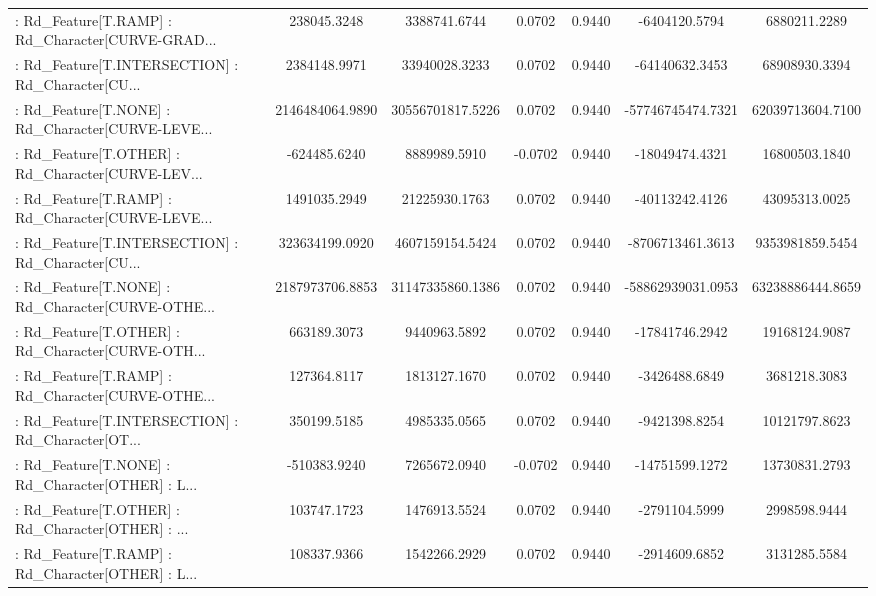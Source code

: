 \begin{longtable}{p{4cm}cccccc}
 : Rd\_Feature[T.RAMP] : Rd\_Character[CURVE-GRAD... &       238045.3248 &      3388741.6744 &  0.0702 &       0.9440 &      -6404120.5794 &      6880211.2289 \\
 : Rd\_Feature[T.INTERSECTION] : Rd\_Character[CU... &      2384148.9971 &     33940028.3233 &  0.0702 &       0.9440 &     -64140632.3453 &     68908930.3394 \\
 : Rd\_Feature[T.NONE] : Rd\_Character[CURVE-LEVE... &   2146484064.9890 &  30556701817.5226 &  0.0702 &       0.9440 &  -57746745474.7321 &  62039713604.7100 \\
 : Rd\_Feature[T.OTHER] : Rd\_Character[CURVE-LEV... &      -624485.6240 &      8889989.5910 & -0.0702 &       0.9440 &     -18049474.4321 &     16800503.1840 \\
 : Rd\_Feature[T.RAMP] : Rd\_Character[CURVE-LEVE... &      1491035.2949 &     21225930.1763 &  0.0702 &       0.9440 &     -40113242.4126 &     43095313.0025 \\
 : Rd\_Feature[T.INTERSECTION] : Rd\_Character[CU... &    323634199.0920 &   4607159154.5424 &  0.0702 &       0.9440 &   -8706713461.3613 &   9353981859.5454 \\
 : Rd\_Feature[T.NONE] : Rd\_Character[CURVE-OTHE... &   2187973706.8853 &  31147335860.1386 &  0.0702 &       0.9440 &  -58862939031.0953 &  63238886444.8659 \\
 : Rd\_Feature[T.OTHER] : Rd\_Character[CURVE-OTH... &       663189.3073 &      9440963.5892 &  0.0702 &       0.9440 &     -17841746.2942 &     19168124.9087 \\
 : Rd\_Feature[T.RAMP] : Rd\_Character[CURVE-OTHE... &       127364.8117 &      1813127.1670 &  0.0702 &       0.9440 &      -3426488.6849 &      3681218.3083 \\
 : Rd\_Feature[T.INTERSECTION] : Rd\_Character[OT... &       350199.5185 &      4985335.0565 &  0.0702 &       0.9440 &      -9421398.8254 &     10121797.8623 \\
 : Rd\_Feature[T.NONE] : Rd\_Character[OTHER] : L... &      -510383.9240 &      7265672.0940 & -0.0702 &       0.9440 &     -14751599.1272 &     13730831.2793 \\
 : Rd\_Feature[T.OTHER] : Rd\_Character[OTHER] : ... &       103747.1723 &      1476913.5524 &  0.0702 &       0.9440 &      -2791104.5999 &      2998598.9444 \\
 : Rd\_Feature[T.RAMP] : Rd\_Character[OTHER] : L... &       108337.9366 &      1542266.2929 &  0.0702 &       0.9440 &      -2914609.6852 &      3131285.5584 \\

\end{longtable}
